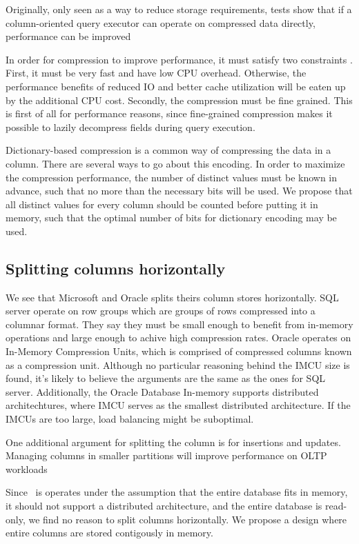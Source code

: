 Originally, only seen as a way to reduce storage requirements, tests show that if a column-oriented query executor can operate on compressed data directly, performance can be improved \cite{Abadi2008-dd}

In order for compression to improve performance, it must satisfy two constraints \cite{Westmann2000-mz}. First, it must be very fast and have low CPU overhead. Otherwise, the performance benefits of reduced IO and better cache utilization will be eaten up by the additional CPU cost. Secondly, the compression must be fine grained. This is first of all for performance reasons, since fine-grained compression makes it possible to lazily decompress fields during query execution.

Dictionary-based compression is a common way of compressing the data in a column. There are several ways to go about this encoding. In order to maximize the compression performance, the number of distinct values must be known in advance, such that no more than the necessary bits will be used. We propose that all distinct values for every column should be counted before putting it in memory, such that the optimal number of bits for dictionary encoding may be used.

\subsection{Splitting columns horizontally}
\label{sub:Splitting columns horizontally}
We see that Microsoft and Oracle splits theirs column stores horizontally. SQL server operate on row groups which are groups of rows compressed into a columnar format. They say they must be small enough to benefit from in-memory operations and large enough to achive high compression rates. Oracle operates on In-Memory Compression Units, which is comprised of compressed columns known as a compression unit. Although no particular reasoning behind the IMCU size is found, it's likely to believe the arguments are the same as the ones for SQL server. Additionally, the Oracle Database In-memory supports distributed architechtures, where IMCU serves as the smallest distributed architecture. If the IMCUs are too large, load balancing might be suboptimal.

One additional argument for splitting the column is for insertions and updates. Managing columns in smaller partitions will improve performance on OLTP workloads

Since \projectName~is operates under the assumption that the entire database fits in memory, it should not support a distributed architecture, and the entire database is read-only, we find no reason to split columns horizontally. We propose a design where entire columns are stored contigously in memory.

